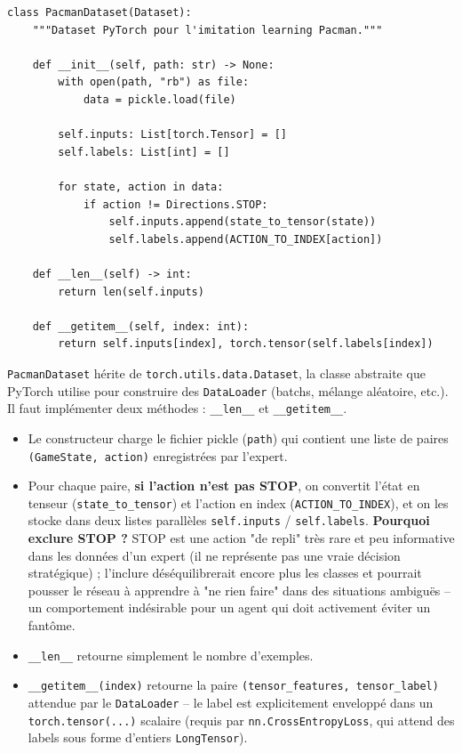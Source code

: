 \documentclass[a4paper,12pt]{article}
\begin{document}
\begin{lstlisting}
class PacmanDataset(Dataset):
    """Dataset PyTorch pour l'imitation learning Pacman."""

    def __init__(self, path: str) -> None:
        with open(path, "rb") as file:
            data = pickle.load(file)

        self.inputs: List[torch.Tensor] = []
        self.labels: List[int] = []

        for state, action in data:
            if action != Directions.STOP:
                self.inputs.append(state_to_tensor(state))
                self.labels.append(ACTION_TO_INDEX[action])

    def __len__(self) -> int:
        return len(self.inputs)

    def __getitem__(self, index: int):
        return self.inputs[index], torch.tensor(self.labels[index])
\end{lstlisting}

\texttt{PacmanDataset} hérite de \texttt{torch.utils.data.Dataset}, la
classe abstraite que PyTorch utilise pour construire des
\texttt{DataLoader} (batchs, mélange aléatoire, etc.). Il faut implémenter
deux méthodes : \texttt{\_\_len\_\_} et \texttt{\_\_getitem\_\_}.

\begin{itemize}
    \item Le constructeur charge le fichier pickle (\texttt{path}) qui
    contient une liste de paires \texttt{(GameState, action)} enregistrées
    par l'expert.
    \item Pour chaque paire, \textbf{si l'action n'est pas STOP}, on
    convertit l'état en tenseur (\texttt{state\_to\_tensor}) et l'action
    en index (\texttt{ACTION\_TO\_INDEX}), et on les stocke dans deux
    listes parallèles \texttt{self.inputs} / \texttt{self.labels}.
    \textbf{Pourquoi exclure STOP ?} STOP est une action "de repli" très
    rare et peu informative dans les données d'un expert (il ne
    représente pas une vraie décision stratégique) ; l'inclure
    déséquilibrerait encore plus les classes et pourrait pousser le
    réseau à apprendre à "ne rien faire" dans des situations ambiguës --
    un comportement indésirable pour un agent qui doit activement éviter
    un fantôme.
    \item \texttt{\_\_len\_\_} retourne simplement le nombre d'exemples.
    \item \texttt{\_\_getitem\_\_(index)} retourne la paire
    \texttt{(tensor\_features, tensor\_label)} attendue par le
    \texttt{DataLoader} -- le label est explicitement enveloppé dans un
    \texttt{torch.tensor(...)} scalaire (requis par
    \texttt{nn.CrossEntropyLoss}, qui attend des labels sous forme
    d'entiers \texttt{LongTensor}).
\end{itemize}
\end{document}
